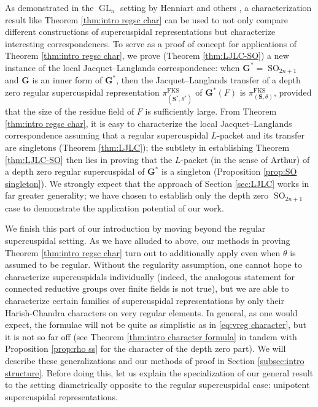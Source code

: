 \documentclass{amsart}
\newcommand{\FKS}{\mathrm{FKS}}
\newcommand{\bfG}{\mathbf{G}}
\newcommand{\bfS}{\mathbf{S}}
\DeclareMathOperator{\GL}{GL}
\DeclareMathOperator{\SO}{SO}
\theoremstyle{plain}
\theoremstyle{definition}
\theoremstyle{remark}
\theoremstyle{theorem}
\begin{document}
As demonstrated in the $\GL_n$ setting by Henniart \cite{Hen92,Hen93} and others \cite{BW13,Cha20,CI21-MA}, a characterization result like Theorem \ref{thm:intro regsc char} can be used to not only compare different constructions of supercuspidal representations but characterize interesting correspondences. 
To serve as a proof of concept for applications of Theorem \ref{thm:intro regsc char}, we prove (Theorem \ref{thm:LJLC-SO}) a new instance of the local Jacquet--Langlands correspondence: when $\bfG^{\ast}= \SO_{2n+1}$ and $\bfG$ is an inner form of $\bfG^{\ast}$, then the Jacquet--Langlands transfer of a depth zero regular supercuspidal representation $\pi_{(\bfS^{\ast},\theta^{\ast})}^{\FKS}$ of $\bfG^{\ast}(F)$ is $\pi_{(\bfS,\theta)}^{\FKS}$, provided that the size of the residue field of $F$ is sufficiently large. From Theorem \ref{thm:intro regsc char}, it is easy to characterize the local Jacquet--Langlands correspondence assuming that a regular supercuspidal $L$-packet and its transfer are singletons (Theorem \ref{thm:LJLC}); the subtlety in establishing Theorem \ref{thm:LJLC-SO} then lies in proving that the $L$-packet (in the sense of Arthur) of a depth zero regular supercuspidal of $\bfG^{\ast}$ is a singleton (Proposition \ref{prop:SO singleton}). We strongly expect that the approach of Section \ref{sec:LJLC} works in far greater generality; we have chosen to establish only the depth zero $\SO_{2n+1}$ case to demonstrate the application potential of our work.

We finish this part of our introduction by moving beyond the regular supercuspidal setting. As we have alluded to above, our methods in proving Theorem \ref{thm:intro regsc char} turn out to additionally apply even when $\theta$ is  assumed to be regular. Without the regularity assumption, one cannot hope to characterize supercuspidals individually (indeed, the analogous statement for connected reductive groups over finite fields is not true), but we are able to characterize certain families of supercuspidal representations by only their Harish-Chandra characters on very regular elements. In general, as one would expect, the formulae will not be quite as simplistic as in \eqref{eq:vreg character}, but it is not so far off (see Theorem \ref{thm:intro character formula} in tandem with Proposition \ref{prop:rho ss} for the character of the depth zero part). We will describe these generalizations and our methods of proof in Section \ref{subsec:intro structure}. Before doing this, let us explain the specialization of our general result to the setting diametrically opposite to the regular supercuspidal case: unipotent supercuspidal representations.
\end{document}
